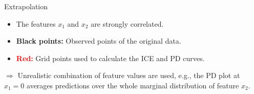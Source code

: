 \documentclass[11pt,compress,t,notes=noshow, aspectratio=169, xcolor=table]{beamer}
\begin{document}
\begin{vbframe}{Extrapolation}
\begin{itemize}
\item The features $x_1$ and $x_2$ are strongly correlated.
\item \textbf{Black points:} Observed points of the original data.
\item \textbf{\textcolor{red}{Red:}} Grid points used to calculate the ICE and PD curves.
\end{itemize}
$\Rightarrow$ Unrealistic combination of feature values are used, e.g., the PD plot at $x_1=0$ averages predictions over the whole marginal distribution of feature $x_2$.
%
%
%
%
\end{vbframe}




%
%
\end{document}
